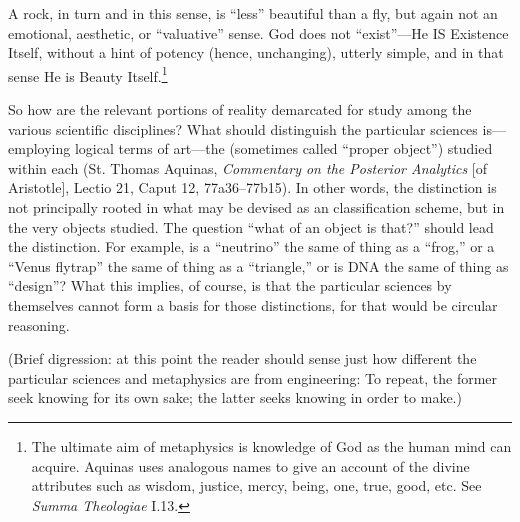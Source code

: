 A rock, in turn and in this sense, is ``less'' beautiful than a fly, but again not an emotional, aesthetic, or ``valuative'' sense. God does not ``exist''---He IS Existence Itself, without a hint of potency (hence, unchanging), utterly simple, and in that sense He is Beauty Itself.\footnote{The ultimate aim of metaphysics is knowledge of God as the human mind can acquire. Aquinas uses analogous names to give an account of the divine attributes such as wisdom, justice, mercy, being, one, true, good, etc. See \textit{Summa Theologiae} I.13.}

So how are the relevant portions of reality demarcated for study among the various scientific disciplines? What should distinguish the particular sciences is---employing logical terms of art---the  (sometimes called ``proper object'') studied within each (St. Thomas Aquinas, \textit{Commentary on the Posterior Analytics} [of Aristotle], Lectio 21, Caput 12, 77a36--77b15). In other words, the distinction is not principally rooted in what may be devised as an  classification scheme, but in the very objects studied. The question ``what  of an object is that?'' should lead the distinction. For example, is a ``neutrino'' the same  of thing as a ``frog,'' or a ``Venus flytrap'' the same  of thing as a ``triangle,'' or is DNA the same  of thing as ``design''? What this implies, of course, is that the particular sciences by themselves cannot form a basis for those distinctions, for that would be circular reasoning.

(Brief digression: at this point the reader should sense just how different the particular sciences and metaphysics are from engineering: To repeat, the former seek knowing for its own sake; the latter seeks knowing in order to make.)

